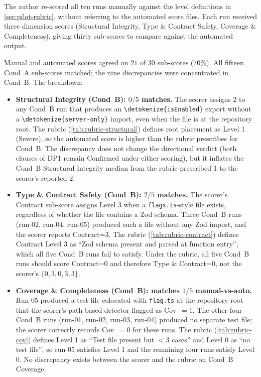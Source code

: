 \documentclass[12pt,a4paper]{report}
\newcommand{\code}[1]{\texttt{\nolinkurl{\detokenize{#1}}}}
\DeclareRobustCommand{\filename}[1]{\bgroup\urlstyle{tt}\nolinkurl{#1}\egroup}
\begin{document}
The author re-scored all ten runs manually against the level definitions in \autoref{sec:pilot-rubric}, without referring to the automated score files. Each run received three dimension scores (Structural Integrity, Type \& Contract Safety, Coverage \& Completeness), giving thirty sub-scores to compare against the automated output.

Manual and automated scores agreed on $21$ of $30$ sub-scores ($70\%$). All fifteen Cond~A sub-scores matched; the nine discrepancies were concentrated in Cond~B. The breakdown:

\begin{itemize}
    \item \textbf{Structural Integrity (Cond~B): $0/5$ matches.} The scorer assigns $2$ to any Cond~B run that produces an \code{isEnabled} export without a \code{server-only} import, even when the file is at the repository root. The rubric (\autoref{tab:rubric-structural}) defines root placement as Level 1 (Severe), so the automated score is higher than the rubric prescribes for Cond~B. The discrepancy does not change the directional verdict (both clauses of DP1 remain Confirmed under either scoring), but it inflates the Cond~B Structural Integrity median from the rubric-prescribed $1$ to the scorer's reported $2$.
    \item \textbf{Type \& Contract Safety (Cond~B): $2/5$ matches.} The scorer's Contract sub-score assigns Level 3 when a \filename{flags.ts}-style file exists, regardless of whether the file contains a Zod schema. Three Cond~B runs (run-02, run-04, run-05) produced such a file without any Zod import, and the scorer reports Contract=3. The rubric (\autoref{tab:rubric-contract}) defines Contract Level 3 as ``Zod schema present and parsed at function entry'', which all five Cond~B runs fail to satisfy. Under the rubric, all five Cond~B runs should score Contract=0 and therefore Type \& Contract=0, not the scorer's $\{0, 3, 0, 3, 3\}$.
    \item \textbf{Coverage \& Completeness (Cond~B): matches $1/5$ manual-vs-auto.} Run-05 produced a test file colocated with \filename{flag.ts} at the repository root that the scorer's path-based detector flagged as Cov~$=1$. The other four Cond~B runs (run-01, run-02, run-03, run-04) produced no separate test file; the scorer correctly records Cov~$=0$ for these runs. The rubric (\autoref{tab:rubric-cov}) defines Level 1 as ``Test file present but $<3$ cases'' and Level 0 as ``no test file'', so run-05 satisfies Level 1 and the remaining four runs satisfy Level 0. No discrepancy exists between the scorer and the rubric on Cond~B Coverage.
\end{itemize}
\end{document}
